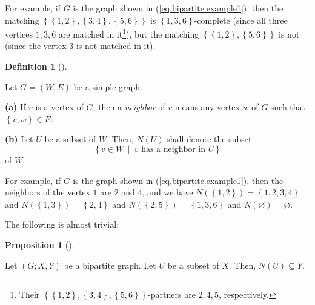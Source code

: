 \documentclass[numbers=enddot,12pt,final,onecolumn,notitlepage]{scrartcl}%
\theoremstyle{definition}
\newtheorem{prop}[theo]{Proposition}
\newenvironment{proposition}[1][]
{\begin{prop}[#1]\begin{leftbar}}
{\end{leftbar}\end{prop}}
\newtheorem{defi}[theo]{Definition}
\newenvironment{definition}[1][]
{\begin{defi}[#1]\begin{leftbar}}
{\end{leftbar}\end{defi}}
\begin{document}
For example, if $G$ is the graph shown in (\ref{eq.bipartite.example1}), then
the matching $\left\{  \left\{  1,2\right\}  ,\left\{  3,4\right\}  ,\left\{
5,6\right\}  \right\}  $ is $\left\{  1,3,6\right\}  $-complete (since all
three vertices $1,3,6$ are matched in it\footnote{Their $\left\{  \left\{
1,2\right\}  ,\left\{  3,4\right\}  ,\left\{  5,6\right\}  \right\}
$-partners are $2,4,5$, respectively.}), but the matching $\left\{  \left\{
1,2\right\}  ,\left\{  5,6\right\}  \right\}  $ is not (since the vertex $3$
is not matched in it).

\begin{definition}
Let $G=\left(  W,E\right)  $ be a simple graph.

\textbf{(a)} If $v$ is a vertex of $G$, then a \textit{neighbor} of $v$ means
any vertex $w$ of $G$ such that $\left\{  v,w\right\}  \in E$.

\textbf{(b)} Let $U$ be a subset of $W$. Then, $N\left(  U\right)  $ shall
denote the subset%
\[
\left\{  v\in W\ \mid\ v\text{ has a neighbor in }U\right\}
\]
of $W$.
\end{definition}

For example, if $G$ is the graph shown in (\ref{eq.bipartite.example1}), then
the neighbors of the vertex $1$ are $2$ and $4$, and we have $N\left(
\left\{  1,2\right\}  \right)  =\left\{  1,2,3,4\right\}  $ and $N\left(
\left\{  1,3\right\}  \right)  =\left\{  2,4\right\}  $ and $N\left(  \left\{
2,5\right\}  \right)  =\left\{  1,3,6\right\}  $ and $N\left(  \varnothing
\right)  =\varnothing$.

The following is almost trivial:

\begin{proposition}
\label{prop.bipartite.NXY}Let $\left(  G;X,Y\right)  $ be a bipartite graph.
Let $U$ be a subset of $X$. Then, $N\left(  U\right)  \subseteq Y$.
\end{proposition}
\end{document}
